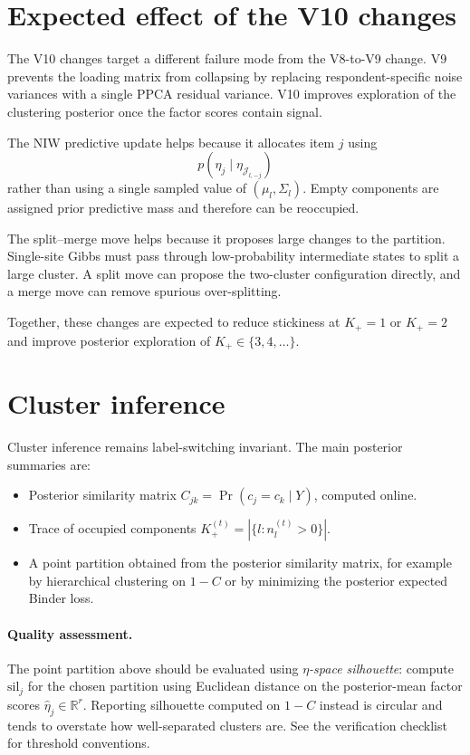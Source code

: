 \documentclass[11pt]{article}
\begin{document}
\section{Expected effect of the V10 changes}

The V10 changes target a different failure mode from the V8-to-V9 change.
V9 prevents the loading matrix from collapsing by replacing
respondent-specific noise variances with a single PPCA residual variance.
V10 improves exploration of the clustering posterior once the factor scores
contain signal.

The NIW predictive update helps because it allocates item $j$ using
\[
    p(\eta_j\mid\eta_{\mathcal J_{l,-j}})
\]
rather than using a single sampled value of $(\mu_l,\Sigma_l)$.  Empty
components are assigned prior predictive mass and therefore can be
reoccupied.

The split--merge move helps because it proposes large changes to the
partition.  Single-site Gibbs must pass through low-probability intermediate
states to split a large cluster.  A split move can propose the two-cluster
configuration directly, and a merge move can remove spurious over-splitting.

Together, these changes are expected to reduce stickiness at $K_+=1$ or
$K_+=2$ and improve posterior exploration of $K_+\in\{3,4,\dots\}$.

\section{Cluster inference}

Cluster inference remains label-switching invariant.  The main posterior
summaries are:
\begin{itemize}[leftmargin=1.5em]
    \item Posterior similarity matrix
    $C_{jk}=\Pr(c_j=c_k\mid Y)$, computed online.
    \item Trace of occupied components
    $K_+^{(t)}=|\{l:n_l^{(t)}>0\}|$.
    \item A point partition obtained from the posterior similarity matrix,
    for example by hierarchical clustering on $1-C$ or by minimizing the
    posterior expected Binder loss.
\end{itemize}

\paragraph{Quality assessment.}  The point partition above should be
evaluated using \emph{$\eta$-space silhouette}: compute
$\mathrm{sil}_j$ for the chosen partition using Euclidean distance on the
posterior-mean factor scores $\hat\eta_j\in\mathbb R^r$.  Reporting
silhouette computed on $1-C$ instead is circular and tends to overstate
how well-separated clusters are.  See the verification checklist for
threshold conventions.
\end{document}
